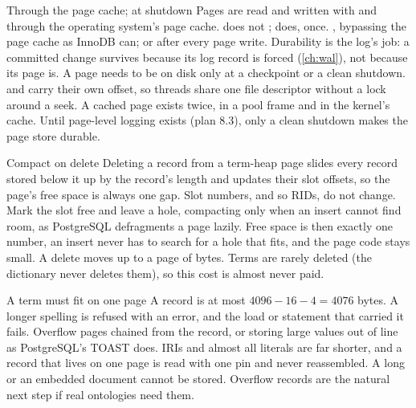 \begin{decision}{Through the page cache;  at shutdown}
 Pages are read and written with  and 
through the operating system's page cache.  does not
;  does, once.
 , bypassing the page cache as InnoDB can;
or  after every page write.
 Durability is the log's job: a committed change survives because
its log record is forced (\cref{ch:wal}), not because its page is. A page needs
to be on disk only at a checkpoint or a clean shutdown.  and
 carry their own offset, so threads share one file descriptor
without a lock around a seek.
 A cached page exists twice, in a pool frame and in the kernel's
cache. Until page-level logging exists (plan 8.3), only a clean shutdown makes
the page store durable.
\end{decision}

\begin{decision}{Compact on delete}
 Deleting a record from a term-heap page slides every record
stored below it up by the record's length and updates their slot offsets, so
the page's free space is always one gap. Slot numbers, and so RIDs, do not
change.
 Mark the slot free and leave a hole, compacting only when
an insert cannot find room, as PostgreSQL defragments a page lazily.
 Free space is then exactly one number, an insert never has to
search for a hole that fits, and the page code stays small.
 A delete moves up to a page of bytes. Terms are rarely deleted
(the dictionary never deletes them), so this cost is almost never paid.
\end{decision}

\begin{decision}{A term must fit on one page}
 A record is at most $4096 - 16 - 4 = 4076$ bytes. A longer
spelling is refused with an error, and the load or statement that carried it
fails.
 Overflow pages chained from the record, or storing large
values out of line as PostgreSQL's TOAST does.
 IRIs and almost all literals are far shorter, and a record that
lives on one page is read with one pin and never reassembled.
 A long  or an embedded document cannot be
stored. Overflow records are the natural next step if real ontologies need
them.
\end{decision}

